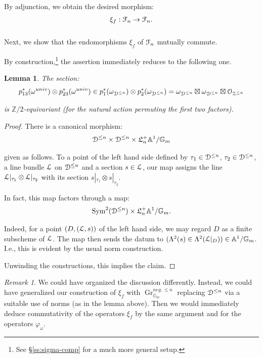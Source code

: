 \documentclass[reqno,11pt]{amsart}
\numberwithin{equation}{subsection}
\newtheorem{lem}[thm]{Lemma}
\theoremstyle{remark}
\newtheorem{rem}[thm]{Remark}
\newcommand{\bA}{{\mathbb A}}
\newcommand{\bG}{{\mathbb G}}
\newcommand{\bZ}{{\mathbb Z}}
\newcommand{\sD}{{\EuScript D}}
\newcommand{\sF}{{\EuScript F}}
\newcommand{\sL}{{\EuScript L}}
\newcommand{\sO}{{\EuScript O}}
\newcommand{\sZ}{{\EuScript Z}}
\newcommand{\fL}{{\mathfrak L}}
\newcommand{\on}{\operatorname}
\newcommand{\vph}{\varphi}
\newcommand{\Gr}{\on{Gr}}
\newcommand{\Sym}{\on{Sym}}
\begin{document}
\noindent By adjunction, we obtain the desired
morphism:
%
\[
\xi_f:\sF_n \to \sF_n.
\]

\subsubsection{}

Next, we show that the endomorphisms
$\xi_f$ of $\sF_n$ mutually commute.

By construction,\footnote{See \S \ref{ss:sigma-comp} for a much more general
setup.}
the assertion immediately reduces to the following one.

\begin{lem}

The section:
%
\[
p_{13}^*(\omega^{univ}) \otimes p_{23}^*(\omega^{univ}) \in 
p_1^*(\omega_{\sD^{\leq n}}) \otimes p_2^*(\omega_{\sD^{\leq n}}) =
\omega_{\sD^{\leq n}} \boxtimes \omega_{\sD^{\leq n}} 
\boxtimes \sO_{\sZ^{\leq n}}
\]

\noindent is $\bZ/2$-equivariant (for the natural action
permuting the first two factors).

\end{lem}

\begin{proof}

There is a canonical morphism:
%
\[
\sD^{\leq n} \times \sD^{\leq n} \times \fL_n^+ \bA^1/\bG_m
\]

\noindent given as follows. To a point of the left hand side 
defined by
$\tau_1 \in \sD^{\leq n}$, $\tau_2 \in \sD^{\leq n}$,
a line bundle $\sL$ on $\sD^{\leq n}$ and a section 
$s \in \sL$, our map assigns the line
$\sL|_{\tau_1} \otimes \sL|_{\tau_2}$ with
its section $s|_{\tau_1}\otimes s|_{\tau_2}$.

In fact, this map factors through a map:
%
\[
\Sym^2(\sD^{\leq n}) \times \fL_n^+ \bA^1/\bG_m.
\]

\noindent Indeed, for a point $(D,(\sL,s))$ of the left hand
side, we may regard $D$ as a finite subscheme of $\sL$.
The map then sends the datum to 
$(\Lambda^2(s) \in \Lambda^2(\sL|_D)) \in \bA^1/\bG_m$.
I.e., this is evident by the usual norm construction.

Unwinding the constructions, this implies the claim.

\end{proof}

\begin{rem}

We could have organized the discussion differently. 
Instead, we could have generalized our
construction of $\xi_f$ with $\Gr_{\bG_m}^{neg,\leq n}$ replacing
$\sD^{\leq n}$ via a suitable use of norms (as in the lemma
above). Then we would immediately deduce commutativity of the
operators $\xi_f$ by the same argument and for the operators
$\vph_{\omega}$.

\end{rem}
\end{document}
